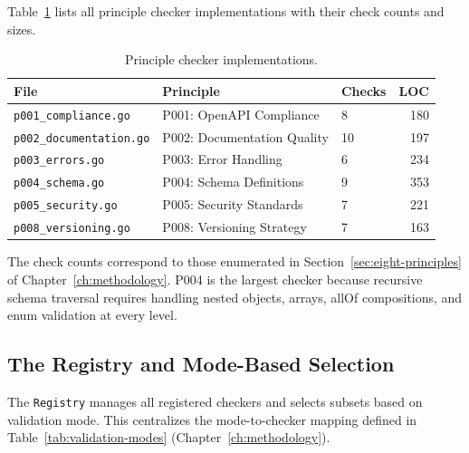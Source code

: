 Table~\ref{tab:checker-implementations} lists all principle checker implementations with their check counts and sizes.

\begin{table}[htbp]
\centering
\caption{Principle checker implementations.}
\label{tab:checker-implementations}
\small
\begin{tabular}{@{}lllr@{}}
\toprule
\textbf{File} & \textbf{Principle} & \textbf{Checks} & \textbf{LOC} \\
\midrule
\texttt{p001\_compliance.go}   & P001: OpenAPI Compliance     & 8  & 180 \\
\texttt{p002\_documentation.go} & P002: Documentation Quality  & 10 & 197 \\
\texttt{p003\_errors.go}       & P003: Error Handling          & 6  & 234 \\
\texttt{p004\_schema.go}       & P004: Schema Definitions      & 9  & 353 \\
\texttt{p005\_security.go}     & P005: Security Standards      & 7  & 221 \\
\texttt{p008\_versioning.go}   & P008: Versioning Strategy     & 7  & 163 \\
\bottomrule
\end{tabular}
\end{table}

The check counts correspond to those enumerated in Section~\ref{sec:eight-principles} of Chapter~\ref{ch:methodology}. P004 is the largest checker because recursive schema traversal requires handling nested objects, arrays, allOf compositions, and enum validation at every level.

\subsection{The Registry and Mode-Based Selection}
\label{subsec:registry}

The \texttt{Registry} manages all registered checkers and selects subsets based on validation mode. This centralizes the mode-to-checker mapping defined in Table~\ref{tab:validation-modes} (Chapter~\ref{ch:methodology}).

